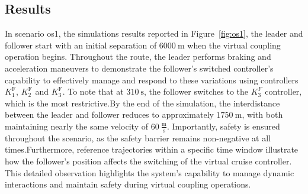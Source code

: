 \documentclass[letterpaper, 10 pt, conference]{ieeeconf}
\theoremstyle{definition}
\theoremstyle{nopoint}
\newcommand{\tildeAdd}{~}
\begin{document}
%							
%							
%							
%							
%							
%							
%							
%							
%							
%					
		
		 \subsection{Results}
		\label{sec:results}
		
		In scenario \gls{os}1, the simulations results reported in Figure\tildeAdd\ref{fig:os1}, the leader and follower start with an initial separation of $6000\tildeAdd\unit{\meter}$ when the virtual coupling operation begins. Throughout the route, the leader performs braking and acceleration maneuvers to demonstrate the follower's switched controller's capability to effectively manage and respond to these variations using controllers \( K_1^{\mathrm{F}} \), \( K_2^{\mathrm{F}} \) and \( K_3^{\mathrm{F}} \). To note that at $310\tildeAdd\unit{\second}$, the follower switches to the \( K_3^F \) controller, which is the most restrictive.By the end of the simulation, the interdistance between the leader and follower reduces to approximately $1750\tildeAdd\unit{\meter}$, with both maintaining nearly the same velocity of $60\tildeAdd\frac{\unit{\meter}}{\unit{\second}}$. Importantly, safety is ensured throughout the scenario, as the safety barrier remains non-negative at all times.Furthermore, reference trajectories within a specific time window illustrate how the follower's position affects the switching of the virtual cruise controller. This detailed observation highlights the system's capability to manage dynamic interactions and maintain safety during virtual coupling operations.
		
\end{document}

